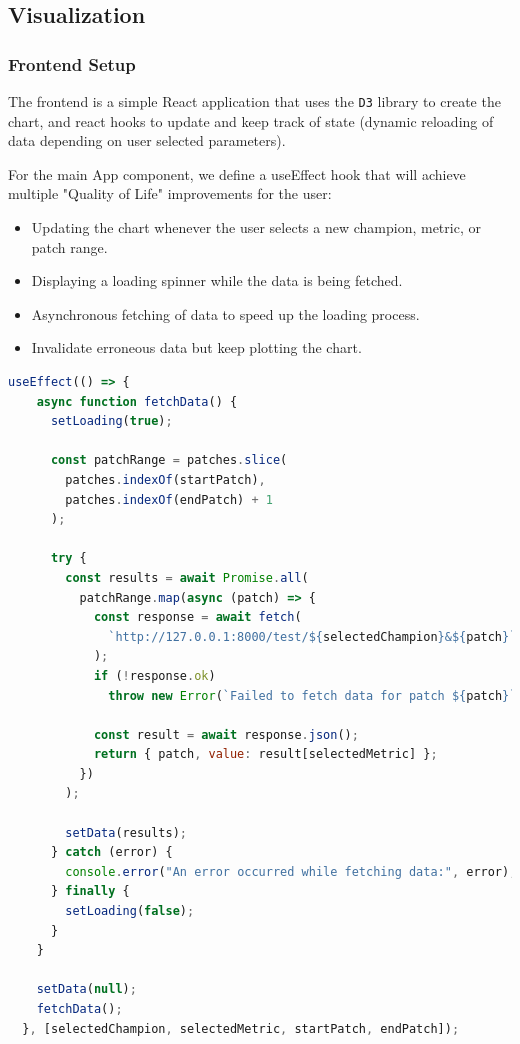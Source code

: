 \documentclass{article}
\begin{document}

\subsection{Visualization}
\label{subsec:Visualization}

\subsubsection{Frontend Setup}
\label{subsubsec:Frontend}

The frontend is a simple React application that uses the 
\texttt{D3} library to create the chart, and react hooks to update 
and keep track of state (dynamic reloading of data depending on user
selected parameters).

For the main App component, we define a useEffect hook that will achieve
multiple "Quality of Life" improvements for the user:
\begin{itemize}
  \item Updating the chart whenever the user selects a new champion, metric, or patch range.
  \item Displaying a loading spinner while the data is being fetched.
  \item Asynchronous fetching of data to speed up the loading process.
  \item Invalidate erroneous data but keep plotting the chart.
\end{itemize}

\begin{lstlisting}[language=Javascript]
useEffect(() => {
    async function fetchData() {
      setLoading(true);

      const patchRange = patches.slice(
        patches.indexOf(startPatch),
        patches.indexOf(endPatch) + 1
      );

      try {
        const results = await Promise.all(
          patchRange.map(async (patch) => {
            const response = await fetch(
              `http://127.0.0.1:8000/test/${selectedChampion}&${patch}`
            );
            if (!response.ok)
              throw new Error(`Failed to fetch data for patch ${patch}`);

            const result = await response.json();
            return { patch, value: result[selectedMetric] };
          })
        );

        setData(results);
      } catch (error) {
        console.error("An error occurred while fetching data:", error);
      } finally {
        setLoading(false);
      }
    }

    setData(null);
    fetchData();
  }, [selectedChampion, selectedMetric, startPatch, endPatch]);
\end{lstlisting}
\end{document}
